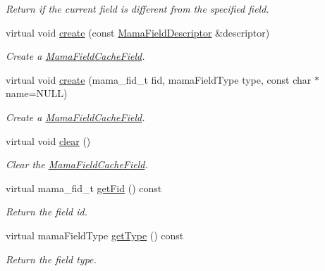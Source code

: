 \begin{DoxyCompactItemize}
\begin{DoxyCompactList}\small\item\em Return if the current field is different from the specified field. \item\end{DoxyCompactList}\item 
virtual void \hyperlink{classWombat_1_1MamaFieldCacheField_a50403ebe0fa4fe5619a950b9758ba819}{create} (const \hyperlink{classWombat_1_1MamaFieldDescriptor}{MamaFieldDescriptor} \&descriptor)
\begin{DoxyCompactList}\small\item\em Create a \hyperlink{classWombat_1_1MamaFieldCacheField}{MamaFieldCacheField}. \item\end{DoxyCompactList}\item 
virtual void \hyperlink{classWombat_1_1MamaFieldCacheField_ac1735aede2db98e3383fe183b1695712}{create} (mama\_\-fid\_\-t fid, mamaFieldType type, const char $\ast$name=NULL)
\begin{DoxyCompactList}\small\item\em Create a \hyperlink{classWombat_1_1MamaFieldCacheField}{MamaFieldCacheField}. \item\end{DoxyCompactList}\item 
virtual void \hyperlink{classWombat_1_1MamaFieldCacheField_a7ecde23453694bc6dfe4c92b38390588}{clear} ()
\begin{DoxyCompactList}\small\item\em Clear the {\ttfamily \hyperlink{classWombat_1_1MamaFieldCacheField}{MamaFieldCacheField}}. \item\end{DoxyCompactList}\item 
virtual mama\_\-fid\_\-t \hyperlink{classWombat_1_1MamaFieldCacheField_a981ff23033f7d225f2b39e442df9dfa0}{getFid} () const 
\begin{DoxyCompactList}\small\item\em Return the field id. \item\end{DoxyCompactList}\item 
virtual mamaFieldType \hyperlink{classWombat_1_1MamaFieldCacheField_a72b0f438fc565c0a4fdf2c47b153f965}{getType} () const 
\begin{DoxyCompactList}\small\item\em Return the field type. \item\end{DoxyCompactList}\item 

\end{DoxyCompactItemize}
